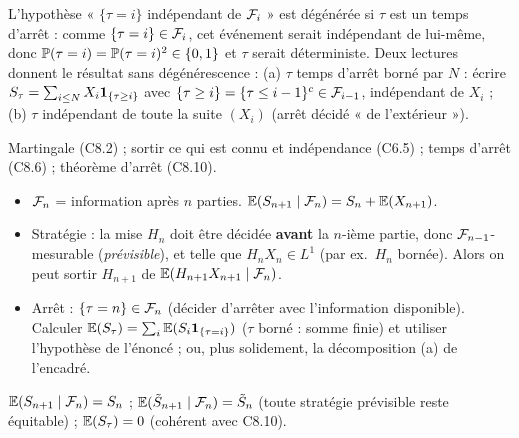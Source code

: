 \documentclass[11pt,a4paper]{article}
\begin{document}
\begin{exo}
\begin{alerte}
L'hypothèse « $\{\tau=i\}$ indépendant de $\mathcal{F}_i$ » est dégénérée si $\tau$ est un temps d'arrêt : comme $\{\tau=i\}\in\mathcal{F}_i$, cet événement
serait indépendant de lui-même, donc $\mathbb{P}(\tau=i)=\mathbb{P}(\tau=i)^2\in\{0,1\}$ et $\tau$ serait déterministe.
Deux lectures donnent le résultat sans dégénérescence : (a) $\tau$ temps d'arrêt borné par $N$ : écrire
$S_\tau=\sum_{i\le N}X_i\mathbf{1}_{\{\tau\ge i\}}$ avec $\{\tau\ge i\}=\{\tau\le i-1\}^c\in\mathcal{F}_{i-1}$, indépendant de $X_i$ ;
(b) $\tau$ indépendant de toute la suite $(X_i)$ (arrêt décidé « de l'extérieur »).
\end{alerte}
\outils Martingale (C8.2) ; sortir ce qui est connu et indépendance (C6.5) ; temps d'arrêt (C8.6) ; théorème d'arrêt (C8.10).

\meth
\begin{itemize}
  \item $\mathcal{F}_n$ = information après $n$ parties. $\mathbb{E}(S_{n+1}\mid\mathcal{F}_n)=S_n+\mathbb{E}(X_{n+1})$.
  \item Stratégie : la mise $H_n$ doit être décidée \textbf{avant} la $n$-ième partie, donc $\mathcal{F}_{n-1}$-mesurable (\emph{prévisible}),
  et telle que $H_nX_n\in L^1$ (par ex.\ $H_n$ bornée). Alors on peut sortir $H_{n+1}$ de $\mathbb{E}(H_{n+1}X_{n+1}\mid\mathcal{F}_n)$.
  \item Arrêt : $\{\tau=n\}\in\mathcal{F}_n$ (décider d'arrêter avec l'information disponible). Calculer
  $\mathbb{E}(S_\tau)=\sum_i\mathbb{E}(S_i\mathbf{1}_{\{\tau=i\}})$ ($\tau$ borné : somme finie) et utiliser l'hypothèse de l'énoncé ; ou, plus solidement, la décomposition (a) de l'encadré.
\end{itemize}

\rep $\mathbb{E}(S_{n+1}\mid\mathcal{F}_n)=S_n$ ; $\mathbb{E}(\tilde S_{n+1}\mid\mathcal{F}_n)=\tilde S_n$ (toute stratégie prévisible reste équitable) ; $\mathbb{E}(S_\tau)=0$
(cohérent avec C8.10).
\end{exo}
\end{document}
